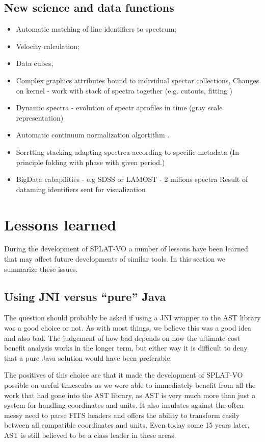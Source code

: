 \documentclass[final,authoryear,5p,times,twocolumn]{elsarticle}
\begin{document}
\subsection{New science and data functions}
\begin{itemize}
\item Automatic matching of line identifiers to spectrum;
\item	Velocity calculation;
\item Data cubes,
\item Complex graphics attributes bound to individual spectar collections, Changes on kernel - work with stack of spectra together (e.g. cutouts, fitting )
\item Dynamic spectra - evolution of spectr aprofiles in time (gray scale representation)
\item Automatic continuum normalization algortithm .
\item Sorrtting stacking adapting spectrea according to specific metadata (In principle folding with phase with given period.)
\item BigData cabapilities - e.g SDSS or LAMOST - 2 milions spectra Result of dataming identifiers sent for visualization
\end{itemize}

\section{Lessons learned}

During the development of SPLAT-VO a number of lessons have been
learned that may affect future developments of similar tools. In this
section we summarize these issues.

\subsection{Using JNI versus ``pure'' Java}

The question should probably be asked if using a JNI wrapper to the
AST library was a good choice or not. As with most things, we believe
this was a good idea and also bad. The judgement of how bad depends on
how the ultimate cost benefit analysis works in the longer term, but
either way it is difficult to deny that a pure Java solution would
have been preferable.

The positives of this choice are that it made the development of
SPLAT-VO possible on useful timescales as we were able to immediately
benefit from all the work that had gone into the AST library, as AST
is very much more than just a system for handling coordinates and
units. It also insulates against the often messy need to parse FITS
headers and offers the ability to transform easily between all
compatible coordinates and units. Even today some 15 years later, AST
is still believed to be a class leader in these areas.
\end{document}
